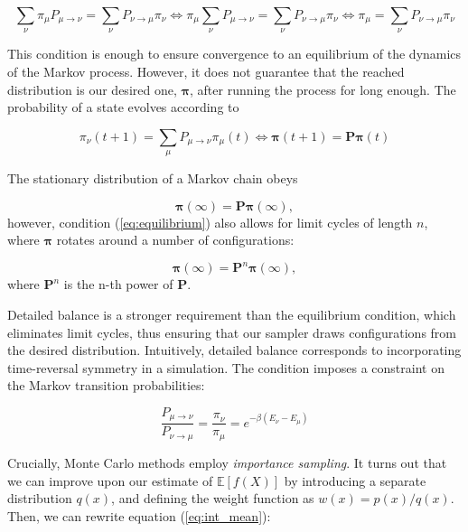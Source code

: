 \begin{equation}\label{eq:equilibrium}
\sum_\nu \pi_\mu P_{\mu \rightarrow \nu} = \sum_\nu P_{\nu \rightarrow \mu} \pi_\nu \iff \pi_\mu \sum_\nu P_{\mu \rightarrow \nu} = \sum_\nu P_{\nu \rightarrow \mu} \pi_\nu \iff \pi_\mu = \sum_\nu P_{\nu \rightarrow \mu} \pi_\nu
\end{equation}

This condition is enough to ensure convergence to an equilibrium of the dynamics of the Markov process.
However, it does not guarantee that the reached distribution is our desired one, $\bm \pi$, after running the process for long enough.
The probability of a state evolves according to

\begin{equation}
\pi_\nu ( t + 1 ) = \sum_\mu P_{\mu\rightarrow\nu}  \pi_\mu ( t ) \iff \bm \pi ( t + 1 ) = \bm P \bm \pi ( t )
\end{equation}

The stationary distribution of a Markov chain obeys

\begin{equation}
\bm \pi ( \infty ) = \bm P \bm \pi ( \infty ) ,
\end{equation}
however, condition (\ref{eq:equilibrium}) also allows  for limit cycles of length $n$, where $\bm \pi$ rotates around a number of configurations:

\begin{equation}
\bm \pi ( \infty ) = \bm P^n \bm \pi ( \infty ) ,
\end{equation}
where $\bm P^n$ is the n-th power of $\bm P$.

Detailed balance is a stronger requirement than the equilibrium condition, which eliminates limit cycles, thus ensuring that our sampler draws configurations from the desired distribution.
Intuitively, detailed balance corresponds to incorporating time-reversal symmetry in a simulation.
The condition imposes a constraint on the Markov transition probabilities:

\begin{equation}\label{eq:markovCondition}
\frac{P_{\mu\rightarrow\nu}}{P_{\nu\rightarrow\mu}} = \frac{\pi_\nu}{\pi_\mu} = e^{-\beta ( E_\nu - E_\mu ) }
\end{equation}

Crucially, Monte Carlo methods employ \emph{importance sampling}.
It turns out that we can improve upon our estimate of $\mathbb{E} [f(X)]$ by introducing a separate distribution $q(x)$, and defining the weight function as $w(x) = p(x)/ q(x)$.
Then, we can rewrite equation (\ref{eq:int_mean}):

